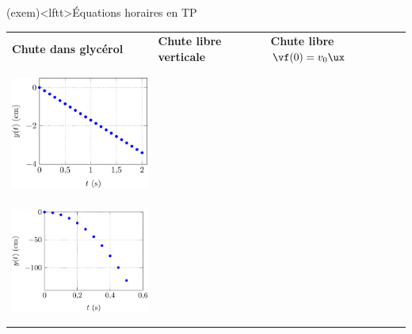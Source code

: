 \documentclass[../../main/main.tex]{subfiles}
\begin{document}
\begin{tcb}(exem)<lftt>{Équations horaires en TP}
	\begin{center}
		\begin{tabularx}{\linewidth}{Y|Y|Y}
			\textbf{Chute dans glycérol}
			 &
			\textbf{Chute libre verticale}
			 &
			\textbf{Chute libre $\vf(0) = v_0\ux$}
			\\
			\begin{center}
				\includegraphics[height=4cm]{x_glyc}
				\\
				\includegraphics[height=4cm]{y_glyc}%
				\vspace*{-25pt}
			\end{center}
			 &
			\begin{center}
				\includegraphics[height=4cm]{x_nov}
				\\
				\includegraphics[height=4cm]{y_nov}%
				\vspace*{-25pt}

\end{center}
\end{tabularx}
\end{center}
\end{tcb}
\end{document}

